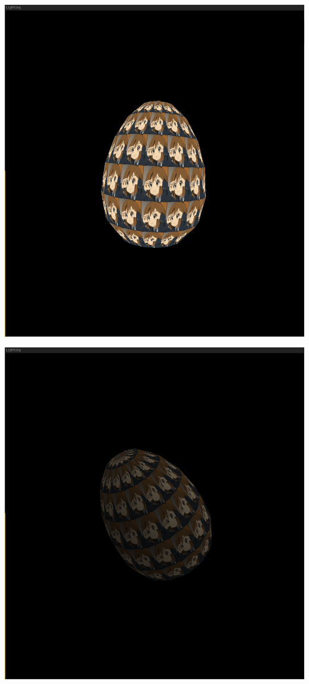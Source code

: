 \documentclass[polish,polish,a4paper]{report}
\begin{document}
\begin{center}
\includegraphics[scale=2]{yuiegg2.png}
\end{center}

\begin{center}
\includegraphics[scale=2]{yuiegg3.png}
\end{center}
\end{document}
